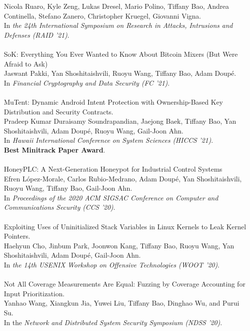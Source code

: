 \documentclass[11pt]{article}
\begin{document}
Nicola Ruaro, Kyle Zeng, Lukas Dresel, Mario Polino, Tiffany Bao, Andrea Continella, Stefano Zanero, Christopher Kruegel, Giovanni Vigna. \\
In \emph{the 24th International Symposium on Research in Attacks, Intrusions and Defenses (RAID '21)}.
\\\\
SoK: Everything You Ever Wanted to Know About Bitcoin Mixers (But Were Afraid to Ask) \\
Jaswant Pakki, Yan Shoshitaishvili, Ruoyu Wang, Tiffany Bao, Adam Doupé. \\
In \emph{Financial Cryptography and Data Security (FC '21)}.
\\\\
MuTent: Dynamic Android Intent Protection with Ownership-Based Key Distribution and Security Contracts. \\
Pradeep Kumar Duraisamy Soundrapandian, Jaejong Baek, Tiffany Bao, Yan Shoshitaishvili, Adam Doupé, Ruoyu Wang, Gail-Joon Ahn. \\
In \emph{Hawaii International Conference on System Sciences (HICCS '21)}. \\
\textbf{Best Minitrack Paper Award}.
\\\\
HoneyPLC: A Next-Generation Honeypot for Industrial Control Systems \\
Efren L\'{o}pez-Morale, Carlos Rubio-Medrano, Adam Doup\'{e}, Yan Shoshitaishvili, Ruoyu Wang, Tiffany Bao, Gail-Joon Ahn.\\
In \emph{Proceedings of the 2020 ACM SIGSAC Conference on Computer and Communications Security (CCS '20)}.
\\\\
Exploiting Uses of Uninitialized Stack Variables in Linux Kernels to Leak Kernel Pointers. \\
Haehyun Cho, Jinbum Park, Joonwon Kang, Tiffany Bao, Ruoyu Wang, Yan Shoshitaishvili, Adam Doupé, Gail-Joon Ahn. \\
In \emph{the 14th USENIX Workshop on Offensive Technologies (WOOT '20)}.
\\\\
Not All Coverage Measurements Are Equal: Fuzzing by Coverage Accounting for Input Prioritization. \\
Yanhao Wang, Xiangkun Jia, Yuwei Liu, Tiffany Bao, Dinghao Wu, and Purui Su. \\
In the \emph{Network and Distributed System Security Symposium (NDSS '20)}.
\\\\
\end{document}
